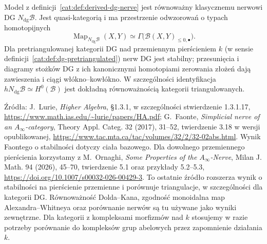 \begin{twierdzenie}\label{cat:thm:derived-dg-nerve-comparison}
Model z definicji~\ref{cat:def:derived-dg-nerve} jest równoważny klasycznemu nerwowi DG $N_{\mathrm{dg}}\mathcal B$. Jest quasi-kategorią i ma przestrzenie odwzorowań o typach homotopijnych
\[
 \operatorname{Map}_{N_{\mathrm{dg}}\mathcal B}(X,Y)
 \simeq \Gamma\bigl(\mathcal B(X,Y)_{\leq0,\bullet}\bigr).
\]
Dla pretriangulowanej kategorii DG nad przemiennym pierścieniem $k$ (w sensie definicji~\ref{cat:def:dg-pretriangulated}) nerw DG jest stabilny; przesunięcia i diagramy stożków DG z ich kanonicznymi homotopiami zerowania złożeń dają zawieszenia i ciągi włókno--kowłókno. W szczególności identyfikacja $hN_{\mathrm{dg}}\mathcal B\simeq H^0(\mathcal B)$ jest dokładną równoważnością kategorii triangulowanych.
\end{twierdzenie}

Źródła: J.~Lurie, \emph{Higher Algebra}, \S1.3.1, w szczególności stwierdzenie 1.3.1.17, \url{https://www.math.ias.edu/~lurie/papers/HA.pdf}; G.~Faonte, \emph{Simplicial nerve of an $A_\infty$-category}, Theory Appl. Categ. 32 (2017), 31--52, twierdzenie 3.18 w wersji opublikowanej, \url{https://www.tac.mta.ca/tac/volumes/32/2/32-02abs.html}. Wynik Faontego o stabilności dotyczy ciała bazowego. Dla dowolnego przemiennego pierścienia korzystamy z M.~Ornaghi, \emph{Some Properties of the $A_\infty$-Nerve}, Milan J. Math. 94 (2026), 45--70, twierdzenie 5.1 oraz przykłady 5.2--5.3, \url{https://doi.org/10.1007/s00032-026-00429-3}. To ostatnie źródło rozszerza wynik o stabilności na pierścienie przemienne i porównuje triangulacje, w szczególności dla kategorii DG. Równoważność Dolda--Kana, zgodność monoidalna map Alexandra--Whitneya oraz porównanie nerwów są tu używane jako wyniki zewnętrzne. Dla kategorii z kompleksami morfizmów nad $k$ stosujemy w razie potrzeby porównanie do kompleksów grup abelowych przez zapomnienie działania $k$.

